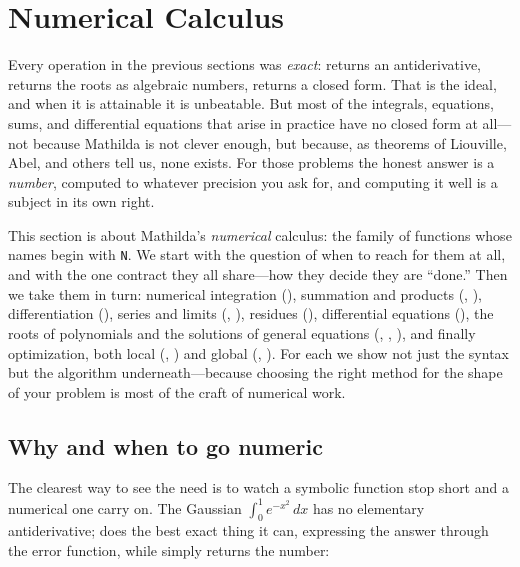 \section{Numerical Calculus}
\label{sec:numcalc}

Every operation in the previous sections was \emph{exact}:  returns an
antiderivative,  returns the roots as algebraic numbers,  returns a closed
form. That is the ideal, and when it is attainable it is unbeatable. But most of the
integrals, equations, sums, and differential equations that arise in practice have no closed
form at all---not because Mathilda is not clever enough, but because, as theorems of Liouville,
Abel, and others tell us, none exists. For those problems the honest answer is a
\emph{number}, computed to whatever precision you ask for, and computing it well is a
subject in its own right.

This section is about Mathilda's \emph{numerical} calculus: the family of functions whose
names begin with \texttt{N}. We start with the question of when to reach for them at all, and
with the one contract they all share---how they decide they are ``done.'' Then we take them in
turn: numerical integration (), summation and products (, ),
differentiation (), series and limits (, ), residues (),
differential equations (), the roots of polynomials and the solutions of general
equations (, , ), and finally optimization, both local
(, ) and global (, ). For each we show
not just the syntax but the algorithm underneath---because choosing the right method for the
shape of your problem is most of the craft of numerical work.

\subsection{Why and when to go numeric}
\label{ssec:whynumeric}

The clearest way to see the need is to watch a symbolic function stop short and a numerical one
carry on. The Gaussian \(\int_0^1 e^{-x^2}\,dx\) has no elementary antiderivative; 
does the best exact thing it can, expressing the answer through the error function, while
 simply returns the number:

\begin{codepairs}
\end{codepairs}

